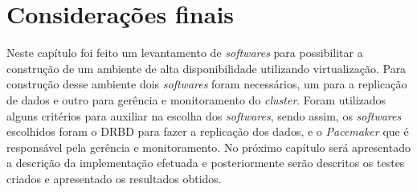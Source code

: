 

\section{Considerações finais}

Neste capítulo foi feito um levantamento de \textit{softwares} para possibilitar a construção de um ambiente de alta disponibilidade utilizando 
virtualização. Para construção desse ambiente dois \textit{softwares} foram necessários, um para a replicação de dados e outro para gerência e 
monitoramento do \textit{cluster}. Foram utilizados alguns critérios para auxiliar na escolha dos \textit{softwares}, sendo assim, os 
\textit{softwares} escolhidos foram o \ac{DRBD} para fazer a replicação dos dados, e o \textit{Pacemaker} que é responsável pela gerência e 
monitoramento.
No próximo capítulo será apresentado a descrição da implementação efetuada e posteriormente serão descritos os testes criados e apresentado 
os resultados obtidos.
